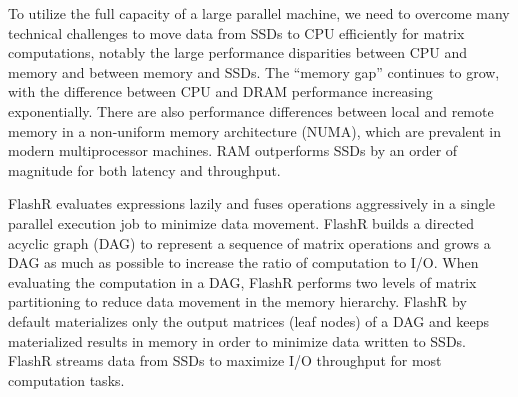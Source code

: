 

To utilize the full capacity of a large parallel machine, we need to overcome
many technical challenges to move data from SSDs to CPU efficiently for matrix
computations,
notably the large performance disparities between CPU and memory and between
memory and SSDs. The ``memory gap'' \cite{Wilkes01} continues to grow, with 
the difference between CPU and DRAM performance increasing exponentially. 
There are also performance differences between
local and remote memory in a non-uniform memory architecture (NUMA), which are prevalent
in modern multiprocessor machines. 
RAM outperforms SSDs by an order of magnitude for both latency and throughput.

FlashR evaluates expressions lazily and fuses operations aggressively
in a single parallel execution job to minimize data movement. FlashR
builds a directed acyclic graph (DAG) to represent a sequence of matrix
operations and grows a DAG as much as possible to increase the ratio of
computation to I/O. When evaluating the computation in a DAG, FlashR
performs two levels of matrix partitioning to reduce data movement in
the memory hierarchy. FlashR by default materializes
only the output matrices (leaf nodes) of a DAG and keeps materialized results in
memory in order to minimize data written to SSDs. FlashR streams
data from SSDs to maximize I/O throughput for most computation tasks.


